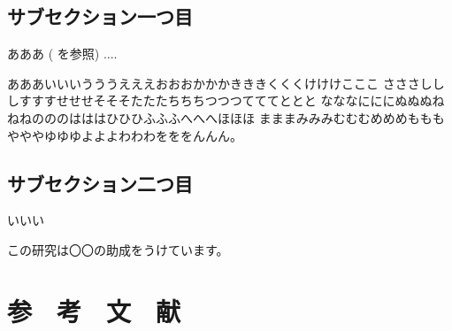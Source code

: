 \documentclass[article]{jlreq}
\begin{document}
\subsection{サブセクション一つ目}
あああ (\cite{abcd} を参照) ....

あああいいいうううえええおおおかかかきききくくくけけけこここ
さささしししすすすせせせそそそたたたちちちつつつてててととと
なななにににぬぬぬねねねのののはははひひひふふふへへへほほほ
まままみみみむむむめめめもももやややゆゆゆよよよわわわをををんんん。


\subsection{サブセクション二つ目}
いいい

\begin{acknowledgements}
  この研究は〇〇の助成をうけています。
\end{acknowledgements}

\section*{\hfil{}参　考　文　献\hfill}
\printbibliography[heading=none]
\end{document}

